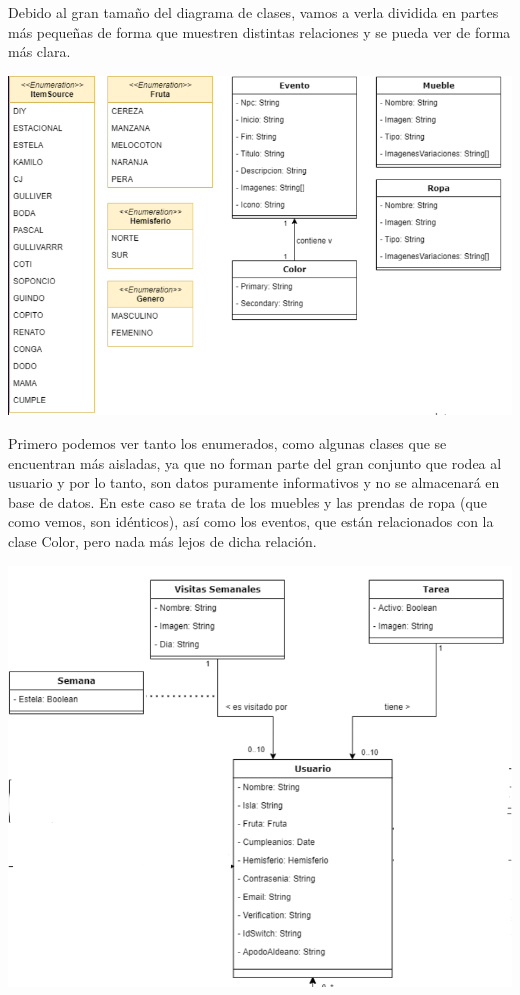 	Debido al gran tamaño del diagrama de clases, vamos a verla dividida en partes más pequeñas de forma que muestren distintas relaciones y se pueda ver de forma más clara.\\
	
		\bigskip
	
	\includegraphics[width=\textwidth]{img/cap5/diagramaclases/enum-y-no-relacionados.png}
	
		\bigskip
	
	Primero podemos ver tanto los enumerados, como algunas clases que se encuentran más aisladas, ya que no forman parte del gran conjunto que rodea al usuario y por lo tanto, son datos puramente informativos y no se almacenará en base de datos. En este caso se trata de los muebles y las prendas de ropa (que como vemos, son idénticos), así como los eventos, que están relacionados con la clase Color, pero nada más lejos de dicha relación.\\ 
	
	\clearpage
	
	\includegraphics[width=\textwidth]{img/cap5/diagramaclases/tareas-visitas.png}
	
